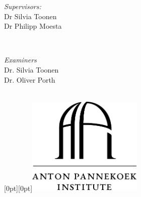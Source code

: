 \begin{titlepage}

\begin{minipage}{0.4\textwidth}
\begin{flushleft} \large
{\large \emph{Supervisors:}}\\

\large{Dr Silvia Toonen}\\ %
\large{Dr Philipp Moesta}
\end{flushleft}
\end{minipage}
~
\begin{minipage}{0.4\textwidth}
\begin{flushright} \large
\emph{Examiners} \\
\large{Dr. Silvia Toonen} \\
\large{Dr. Oliver Porth} %
\end{flushright}
\end{minipage}\\



\raisebox{-138pt}[0pt][0pt]{\includegraphics[width=5.5cm]{Thesis/logos/api_logo.pdf}}\\ %




\vfill 

\end{titlepage}

\newpage

\mbox{}


\newpage
{}
\setcounter{page}{1}
{
  \hypersetup{linkcolor=black}
\tableofcontents

\newpage
\thispagestyle{empty}
\mbox{}
\newpage

\listoffigures

\newpage
\thispagestyle{empty}
\mbox{}
\newpage

\listoftables

\newpage
\thispagestyle{empty}
\mbox{}
\newpage

\mbox{}
\thispagestyle{empty}
\printacronyms[include-classes=abbrev,name=List of Abbreviations]


}






